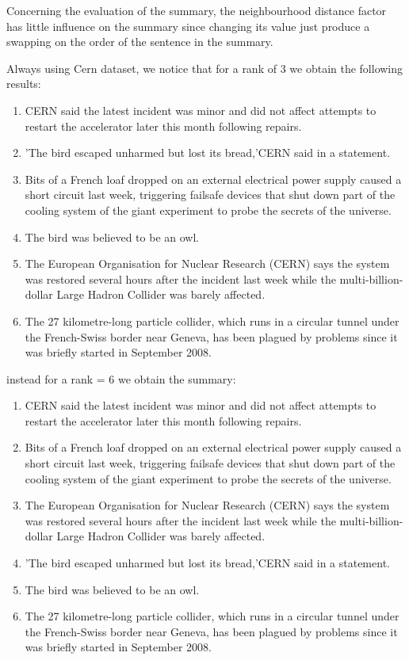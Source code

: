 Concerning the evaluation of the summary, the neighbourhood distance factor has little influence on the summary since changing its value just produce a swapping on the order of the sentence in the summary.

Always using Cern dataset, we notice that for a rank of 3 we obtain the following results:

\begin{enumerate}
	\item CERN said the latest incident was minor and did not affect attempts to restart the accelerator later this month following repairs.
	\item 'The bird escaped unharmed but lost its bread,'CERN said in a statement.
	\item Bits of a French loaf dropped on an external electrical power supply caused a short circuit last week, triggering failsafe devices that shut down part of the cooling system of the giant experiment to probe the secrets of the universe.
	\item The bird was believed to be an owl.
	\item The European Organisation for Nuclear Research (CERN) says the system was restored several hours after the incident last week while the multi-billion-dollar Large Hadron Collider was barely affected.
	\item The 27 kilometre-long particle collider, which runs in a circular tunnel under the French-Swiss border near Geneva, has been plagued by problems since it was briefly started in September 2008.
\end{enumerate}

instead for a rank = 6 we obtain the summary:

\begin{enumerate}
	\item CERN said the latest incident was minor and did not affect attempts to restart the accelerator later this month following repairs.
	\item Bits of a French loaf dropped on an external electrical power supply caused a short circuit last week, triggering failsafe devices that shut down part of the cooling system of the giant experiment to probe the secrets of the universe.
	\item The European Organisation for Nuclear Research (CERN) says the system was restored several hours after the incident last week while the multi-billion-dollar Large Hadron Collider was barely affected.
	\item 'The bird escaped unharmed but lost its bread,'CERN said in a statement. 
	\item The bird was believed to be an owl.
	\item The 27 kilometre-long particle collider, which runs in a circular tunnel under the French-Swiss border near Geneva, has been plagued by problems since it was briefly started in September 2008.
\end{enumerate}

